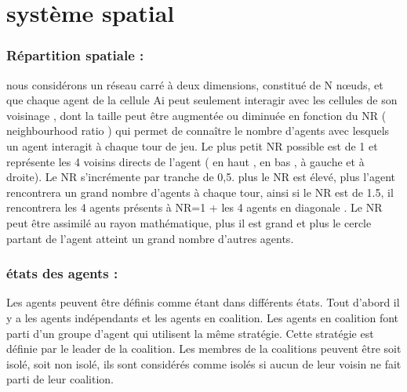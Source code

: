 \documentclass[30pt]{report}
\begin{document}
\part{système spatial}
\section{Répartition spatiale :}
	nous considérons un réseau carré à deux dimensions, constitué de N nœuds, et que chaque agent de la cellule Ai peut seulement interagir avec les cellules de son voisinage , dont la taille peut être augmentée ou diminuée en fonction du NR ( neighbourhood ratio ) qui permet de connaître le nombre d'agents avec lesquels un agent interagit à chaque tour de jeu. 
	\newline
	\newline
	Le plus petit NR possible est de 1 et représente les 4 voisins directs de l'agent ( en haut , en bas , à gauche et à droite). 
	\newline
	\newline
	Le NR s'incrémente par tranche de 0,5. plus le NR est élevé, plus l'agent rencontrera un grand nombre d'agents à chaque tour, ainsi si le NR est de 1.5, il rencontrera les 4 agents présents à NR=1 + les 4 agents en diagonale . 
	\newline
	\newline
	Le NR peut être assimilé au rayon mathématique, plus il est grand et plus le cercle partant de l'agent atteint un grand nombre d'autres agents.
	\newline
\section{états des agents :}
	Les agents peuvent être définis comme étant dans différents états.
	\newline
	\newline
Tout d'abord il y a les agents indépendants et les agents en coalition.
\newline
	\newline
Les agents en coalition font parti d'un groupe d'agent qui utilisent la même stratégie. Cette stratégie est définie par le leader de la coalition.
\newline
	\newline
Les membres de la coalitions peuvent être soit isolé, soit non isolé, ils sont considérés comme isolés si aucun de leur voisin ne fait parti de leur coalition.
\newline
\end{document}
